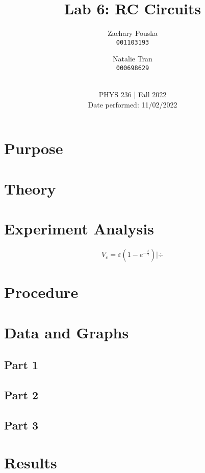\documentclass[titlepage]{article}
\begin{document}
\title{\textbf{Lab 6: RC Circuits}}
\author{
    Zachary Pouska\\
    \texttt{001103193}\\
    \and
    Natalie Tran \\ 
    \texttt{000698629}\\ \\
} 

\date{PHYS 236 | Fall 2022\\
Date performed: 11/02/2022}


	\maketitle



	\section{Purpose}
	\section{Theory}	
	\section{Experiment Analysis}


    $$V_c = \varepsilon \left( 1- e^{-\frac{t}{\tau}} \right)  | \div $$
    



	\section{Procedure}




	\section{Data and Graphs}
	\subsection{Part 1}
	\subsection{Part 2} 
	\subsection{Part 3}
	\section{Results}
\end{document}
